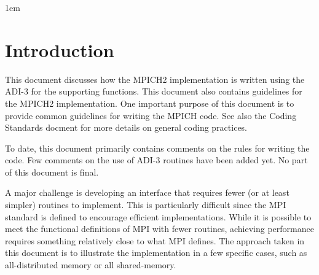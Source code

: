\documentclass{article}
\begin{document}


{}

\clearpage

\tableofcontents
\clearpage


\raggedright
\parindent 1em
\parskip 0pt
\pagestyle{headings}

\section{Introduction}
This document discusses how the MPICH2 implementation is written using
the ADI-3 \cite{adi3man} for the supporting functions.  This document
also contains guidelines for the MPICH2 implementation.  One important
purpose of this document is to provide common guidelines for writing
the MPICH code. 
See also the Coding Standards docment \cite{coding-standards} for more
details on general coding practices.

To date, this document primarily contains comments on the rules for
writing the code.  Few comments on the use of ADI-3 routines have been
added yet.  No part of this document is final.

A major challenge is developing an interface that requires fewer (or
at least simpler) routines to implement.  This is particularly
difficult since the MPI standard is defined to encourage efficient
implementations.  While it is possible to meet the functional
definitions of MPI with fewer routines, achieving performance requires
something relatively close to what MPI defines.
The approach taken in this document is to illustrate the
implementation in a few specific cases, such as all-distributed memory
or all shared-memory.
\end{document}
